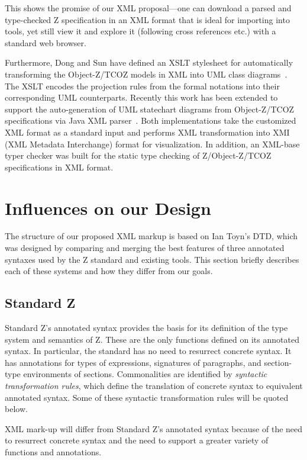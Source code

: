 \documentclass{llncs}  %
\begin{document}
This shows the promise of our XML proposal---one can download a parsed
and type-checked Z specification in an XML format that is ideal for
importing into tools, yet still view it and explore it (following
cross references etc.) with a standard web browser.

Furthermore, Dong and Sun have defined an XSLT stylesheet for
automatically transforming the Object-Z/TCOZ models in XML into UML
class diagrams~\cite{sun01www}. The XSLT encodes the projection rules
from the formal notations into their corresponding UML
counterparts. Recently this work has been extended to support the
auto-generation of UML statechart diagrams from Object-Z/TCOZ
specifications via Java XML parser~\cite{dong02icfem}. Both
implementations take the customized XML format as a standard input and
performs XML transformation into XMI (XML Metadata Interchange) format
for visualization. In addition, an XML-base typer checker was built
for the static type checking of Z/Object-Z/TCOZ specifications in XML
format.


\section{Influences on our Design}

The structure of our proposed XML markup is based on Ian Toyn's DTD,
which was designed by comparing and merging the best features
of three annotated syntaxes used by the Z standard and existing tools.
This section briefly describes each of these systems and how they
differ from our goals.

\subsection{Standard Z}

Standard Z's annotated syntax provides the basis for its definition
of the type system and semantics of Z.
These are the only functions defined on its annotated syntax.
In particular, the standard has no need to resurrect concrete syntax.
It has annotations for types of expressions,
signatures of paragraphs, and section-type environments of sections.
Commonalities are identified by \textit{syntactic transformation rules},
which define the translation of concrete syntax to equivalent annotated syntax.
Some of these syntactic transformation rules will be quoted below.

XML mark-up will differ from Standard Z's annotated syntax
because of the need to resurrect concrete syntax
and the need to support a greater variety of functions and annotations.
\end{document}
